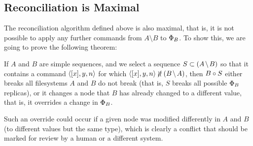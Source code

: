 
\subsection{Reconciliation is Maximal}



The reconciliation algorithm defined above is also maximal, that is,
it is not possible to apply any further commands from $A\setminus B$ to $\Phi_B$.
To show this, we are going to prove the following theorem:

\begin{myth}\label{rec_is_complete}
If $A$ and $B$ are simple sequences,
and we select a sequence $S\subset \amb$ so that
it contains a command $\langle{[x],y,n}\rangle$ for which $\cxynv\nindep\bma$,
then $B\circ S$ either breaks all filesystems $A$ and $B$ do not break
(that is, $S$ breaks all possible $\Phi_B$ replicas),
or it changes a node that $B$ has already changed to a different value,
that is, it overrides a change in $\Phi_B$.
\end{myth}
Such an override could occur if a given node was modified differently in
$A$ and $B$ (to different values but the same type), which is clearly
a conflict that should be marked for review
by a human or a different system.
